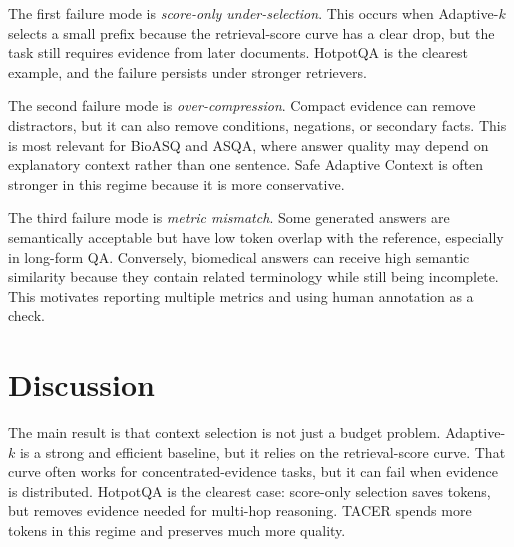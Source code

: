 \documentclass[11pt]{article}
\begin{document}
The first failure mode is \textit{score-only under-selection}. This occurs when Adaptive-$k$ selects a small prefix because the retrieval-score curve has a clear drop, but the task still requires evidence from later documents. HotpotQA is the clearest example, and the failure persists under stronger retrievers.

The second failure mode is \textit{over-compression}. Compact evidence can remove distractors, but it can also remove conditions, negations, or secondary facts. This is most relevant for BioASQ and ASQA, where answer quality may depend on explanatory context rather than one sentence. Safe Adaptive Context is often stronger in this regime because it is more conservative.

The third failure mode is \textit{metric mismatch}. Some generated answers are semantically acceptable but have low token overlap with the reference, especially in long-form QA. Conversely, biomedical answers can receive high semantic similarity because they contain related terminology while still being incomplete. This motivates reporting multiple metrics and using human annotation as a check.

\begin{table}[t]
\centering
\small
\caption{Qualitative interpretation of common context-selection regimes.}
\label{tab:regimes}
\end{table}

\section{Discussion}

The main result is that context selection is not just a budget problem. Adaptive-$k$ is a strong and efficient baseline, but it relies on the retrieval-score curve. That curve often works for concentrated-evidence tasks, but it can fail when evidence is distributed. HotpotQA is the clearest case: score-only selection saves tokens, but removes evidence needed for multi-hop reasoning. TACER spends more tokens in this regime and preserves much more quality.
\end{document}
